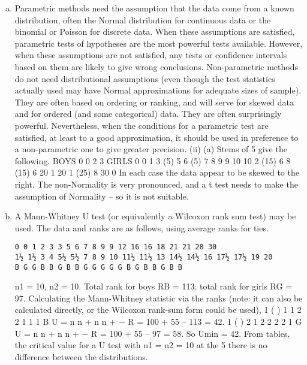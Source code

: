 \documentclass[a4paper,12pt]{article}
\begin{document}
\begin{enumerate}[(a)]
\item  Parametric methods need the assumption that the data come from a known
distribution, often the Normal distribution for continuous data or the binomial or
Poisson for discrete data. When these assumptions are satisfied, parametric tests of
hypotheses are the most powerful tests available. However, when these assumptions
are not satisfied, any tests or confidence intervals based on them are likely to give
wrong conclusions.
Non-parametric methods do not need distributional assumptions (even though the test
statistics actually used may have Normal approximations for adequate sizes of
sample). They are often based on ordering or ranking, and will serve for skewed data
and for ordered (and some categorical) data. They are often surprisingly powerful.
Nevertheless, when the conditions for a parametric test are satisfied, at least to a good
approximation, it should be used in preference to a non-parametric one to give greater
precision.
(ii) (a) Stems of 5 give the following.
BOYS 0 0 2 3 GIRLS 0 0 1 3
(5) 5 6 (5) 7 8 9 9
10 10 2
(15) 6 8 (15) 6
20 1 20 1
(25) 8
30 0
In each case the data appear to be skewed to the right. The non-Normality is
very pronounced, and a t test needs to make the assumption of Normality – so
it is not suitable.
\item A Mann-Whitney U test (or equivalently a Wilcoxon rank sum test)
may be used. The data and ranks are as follows, using average ranks for ties.
\begin{verbatim}
0 0 1 2 3 3 5 6 7 8 9 9 12 16 16 18 21 21 28 30
1½ 1½ 3 4 5½ 5½ 7 8 9 10 11½ 11½ 13 14½ 14½ 16 17½ 17½ 19 20
B G G B B G B B G G G G G B G B B G B B    
\end{verbatim}

n1 = 10, n2 = 10. Total rank for boys RB = 113; total rank for girls RG = 97.
Calculating the Mann-Whitney statistic via the ranks (note: it can also be
calculated directly, or the Wilcoxon rank-sum form could be used),
1 ( )
1 1 2 2 1 1 1 B U = n n + n n + − R = 100 + 55 – 113 = 42.
1 ( )
2 1 2 2 2 2 1 G U = n n + n n + − R = 100 + 55 – 97 = 58.
So Umin = 42. From tables, the critical value for a U test with n1 = n2 = 10 at
the 5%
there is no difference between the distributions.
\end{enumerate}
\end{document}
